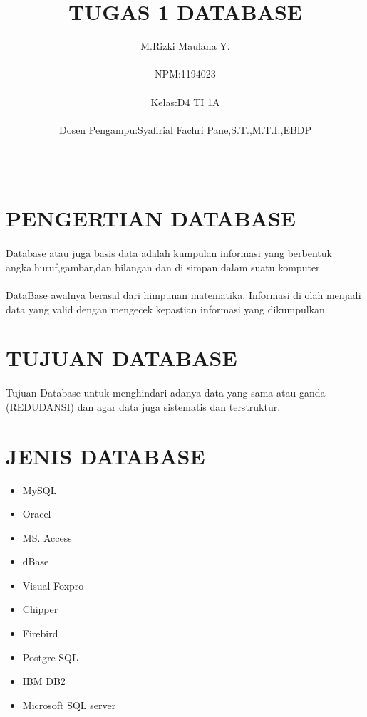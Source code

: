 \documentclass[a4paper,12pt]{article}
\title{TUGAS 1 DATABASE}
\author{M.Rizki Maulana Y. \\\\ NPM:1194023 \\\\ Kelas:D4 TI 1A \\\\ Dosen Pengampu:Syafirial Fachri Pane,S.T.,M.T.I.,EBDP}
\begin{document}
\maketitle
\begin{center}
\begin{tabular}{c c}
\end{tabular}
\end{center}
\section{PENGERTIAN DATABASE}
\paragraph{}
Database atau juga basis data adalah kumpulan informasi yang berbentuk angka,huruf,gambar,dan bilangan dan di simpan dalam suatu komputer.
\paragraph{}
DataBase awalnya berasal dari himpunan matematika.        Informasi di  olah menjadi data yang valid dengan mengecek kepastian informasi yang dikumpulkan.
\section{TUJUAN DATABASE}
\paragraph{}
Tujuan Database untuk menghindari adanya data yang sama atau ganda (REDUDANSI) dan agar data juga sistematis dan terstruktur.
\section{JENIS DATABASE}
\begin{itemize}
\item MySQL
\item Oracel
\item MS. Access
\item dBase
\item Visual Foxpro
\item Chipper
\item Firebird
\item Postgre SQL
\item IBM DB2
\item Microsoft SQL server
\end{itemize}
\end{document}
